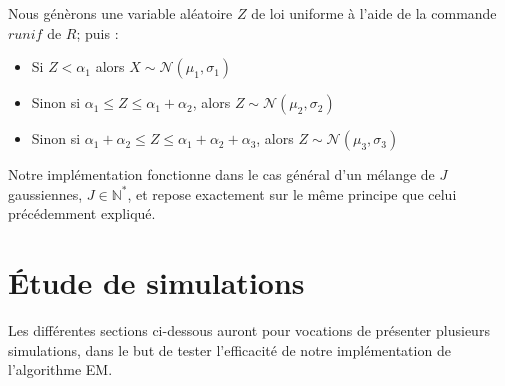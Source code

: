 \documentclass[frenchb]{report}
\newcommand{\1}{\mathbbm{1}}
\theoremstyle{definition}\newtheorem{defn}{Définition}
\theoremstyle{definition}\newtheorem{exm}{Exemple}
\theoremstyle{definition}\newtheorem{nota}{Notation}
\theoremstyle{definition}\newtheorem{rem}{Remarque}
\begin{document}
Nous génèrons une variable aléatoire $Z$ de loi uniforme à l'aide de la commande $runif$ de $R$; puis :
\begin{itemize}
	\item Si $Z < \alpha_1$ alors $X \sim \mathcal{N}(\mu_1, \sigma_1)$ \\
	\item Sinon si $\alpha_1 \leq Z \leq \alpha_1 + \alpha_2$, alors $Z \sim \mathcal{N}(\mu_2, \sigma_2)$ \\
	\item Sinon si  $\alpha_1 + \alpha_2 \leq Z \leq \alpha_1 + \alpha_2 + \alpha_3$, alors $Z \sim \mathcal{N}(\mu_3, \sigma_3)$
\end{itemize}
Notre implémentation fonctionne dans le cas général d'un mélange de $J$ gaussiennes, $J \in \mathbb{N^*}$, et repose exactement sur le même principe que celui précédemment expliqué.



\section{Étude de simulations}
Les différentes sections ci-dessous auront pour vocations de présenter plusieurs simulations, dans le but de tester l'efficacité de notre implémentation de l'algorithme EM.
\end{document}
